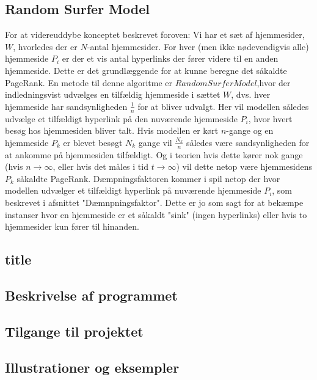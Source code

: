 \subsection*{Random Surfer Model}
For at videreuddybe konceptet beskrevet foroven: Vi har et sæt af hjemmesider, $W$, hvorledes der er $N$-antal hjemmesider. For hver (men ikke nødevendigvis alle) hjemmeside $P_i$ er der et vis antal hyperlinks der fører videre til en anden hjemmeside. Dette er det grundlæggende for at kunne beregne det såkaldte PageRank. En metode til denne algoritme er $Random Surfer Model$,hvor der indledningsvist udvælges en tilfældig hjemmeside i sættet $W$, dvs. hver hjemmeside har sandsynligheden $\frac{1}{n}$ for at bliver udvalgt. Her vil modellen således udvælge et tilfældigt hyperlink på den nuværende hjemmeside $P_i$, hvor hvert besøg hos hjemmesiden bliver talt. Hvis modellen er kørt $n$-gange og en hjemmeside $P_k$ er blevet besøgt $N_k$ gange vil $\frac{N_k}{n}$ således være sandsynligheden for at ankomme på hjemmesiden tilfældigt. Og i teorien hvis dette kører nok gange (hvis $n \rightarrow \infty$, eller hvis det måles i tid $t \rightarrow \infty$) vil dette netop være hjemmesidens $P_k$ såkaldte PageRank. Dæmpningsfaktoren kommer i spil netop der hvor modellen udvælger et tilfældigt hyperlink på nuværende hjemmeside $P_i$, som beskrevet i afsnittet "Dæmnpningsfaktor". Dette er jo som sagt for at bekæmpe instanser hvor en hjemmeside er et såkaldt "sink" (ingen hyperlinks) eller hvis to hjemmesider kun fører til hinanden.


\subsection*{title}

\subsection*{Beskrivelse af programmet}

\subsection*{Tilgange til projektet}

\subsection*{Illustrationer og eksempler}